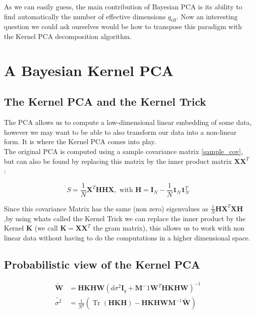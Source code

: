 \documentclass{article}
\begin{document}
As we can easily guess, the main contribution of Bayesian PCA is its ability to find automatically the number of effective dimensions $q_{\text{eff}}$. Now an interesting question we could ask ourselves would be how to transpose this paradigm with the Kernel PCA decomposition algorithm.

\section{A Bayesian Kernel PCA}

\subsection{The Kernel PCA and the Kernel Trick}

The PCA allows us to compute a low-dimensional linear embedding of some data, however we may want to be able to also transform our data into a non-linear form. It is where the Kernel PCA comes into play.\\
The original PCA is computed using a sample covariance matrix \ref{sample_cov}, but can also be found by replacing this matrix by the inner product matrix \cite{KevinP.Murphy17} $\mathbf{X} \mathbf{X}^T$ :

$$ S = \frac{1}{N} \mathbf{X}^T \mathbf{H} \mathbf{H} \mathbf{X}, \text{ with }  \mathbf{H} = \mathbf{I}_N -\frac{1}{N} \mathbf{1}_N \mathbf{1}_N^T
$$

Since this covariance Matrix has the same (non zero) eigenvalues as $\frac{1}{N} \mathbf{H}  \mathbf{X}^T \mathbf{X} \mathbf{H}$,by using whats called the Kernel Trick we can replace the inner product by the Kernel $\mathbf{K}$ (we call $\mathbf{K} = \mathbf{X}\mathbf{X}^T$ the gram matrix), this allows us to work with non linear data without having to do the computations in a higher dimensional space.

\subsection{Probabilistic view of the Kernel PCA}

\cite{pkpca}

\begin{equation}
    \begin{aligned}
        \widetilde{ \mathbf{W}} &= \mathbf{H} \mathbf{K} \mathbf{H} \mathbf{W} (d \sigma^2 \mathbf{I}_q + \mathbf{M}^-1 \mathbf{W}^T \mathbf{H} \mathbf{K} \mathbf{H} \mathbf{W})^{-1} \\
        \widetilde{ \sigma^2 } &= \frac{1}{N^2} ( \operatorname{Tr}(\mathbf{H} \mathbf{K} \mathbf{H}) - \mathbf{H} \mathbf{K} \mathbf{H} \mathbf{W} \mathbf{M}^{-1} \widetilde{ \mathbf{W}} )
    \end{aligned}
    \label{em_pkpca}
\end{equation}
\end{document}
